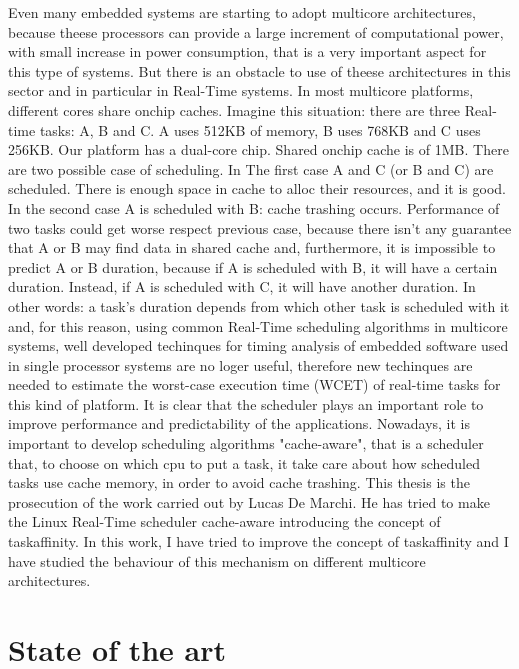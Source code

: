 Even many embedded systems are starting to adopt multicore architectures, because theese processors can provide a large increment of computational power,
with small increase in power consumption, that is a very important aspect for this type of systems.
But there is an obstacle to use of theese architectures in this sector and in particular in Real-Time systems.
In most multicore platforms, different cores share onchip caches. Imagine this situation: there are three Real-time tasks: A, B and C. 
A uses 512KB of memory, B uses 768KB and C uses 256KB. Our platform has a dual-core chip. Shared onchip cache is of 1MB.
There are two possible case of scheduling. In The first case A and C (or B and C) are scheduled. There is enough space in cache to alloc their resources, 
and it is good. In the second case A is scheduled with B: cache trashing occurs. Performance of two tasks could get worse respect previous case, because 
there isn't any guarantee that A or B may find data in shared cache and, furthermore, it is impossible to predict A or B duration, because if A is 
scheduled with B, it will have a certain duration. Instead, if A is scheduled with C, it will have another duration.
In other words: a task's duration depends from which other task is scheduled with it and, for this reason, using common Real-Time scheduling algorithms in 
multicore systems, well developed techinques for timing analysis of embedded software used in single processor systems are no loger useful, therefore 
new techinques are needed to estimate the worst-case execution time (WCET) of real-time tasks for this kind of platform. 
It is clear that the scheduler plays an important role to improve performance and predictability of the applications. Nowadays, it is 
important to develop scheduling algorithms "cache-aware", that is a scheduler that, to choose on which cpu to put a task, it take care about how scheduled 
tasks use cache memory, in order to avoid cache trashing.
This thesis is the prosecution of the work carried out by Lucas De Marchi. He has tried to make the Linux Real-Time scheduler cache-aware
introducing the concept of taskaffinity. In this work, I have tried to improve the concept of taskaffinity and I 
have studied the behaviour of this mechanism on different multicore architectures.

\section{State of the art}
\label{sec:StateOfTheArt}

